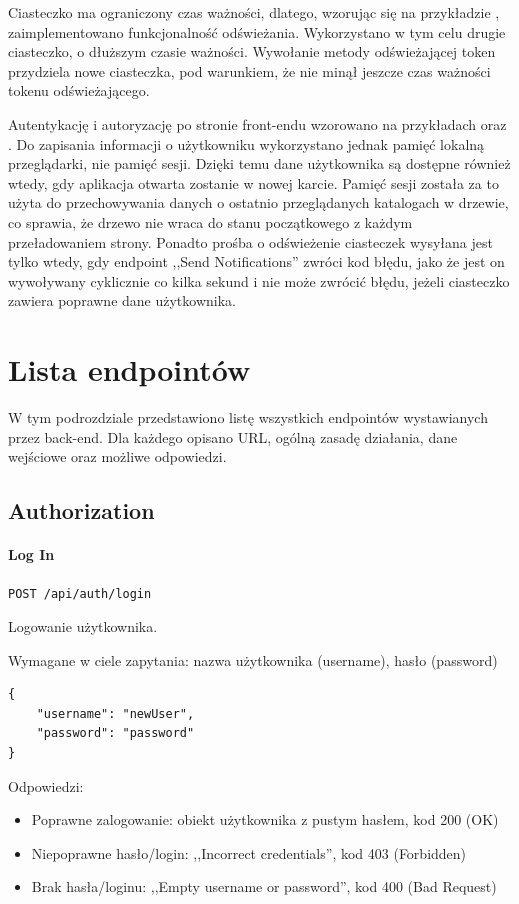 \documentclass[a4paper,twoside,12pt]{book}
\begin{document}
Ciasteczko ma ograniczony czas ważności, dlatego, wzorując się na przykładzie \cite{bib:bkspringrefresh}, zaimplementowano funkcjonalność odświeżania. Wykorzystano w tym celu drugie ciasteczko, o dłuższym czasie ważności. Wywołanie metody odświeżającej token przydziela nowe ciasteczka, pod warunkiem, że nie minął jeszcze czas ważności tokenu odświeżającego.

Autentykację i autoryzację po stronie front-endu wzorowano na przykładach \cite{bib:bkangularauth} oraz \cite{bib:bkangularrefresh}. Do zapisania informacji o użytkowniku wykorzystano jednak pamięć lokalną przeglądarki, nie pamięć sesji. Dzięki temu dane użytkownika są dostępne również wtedy, gdy aplikacja otwarta zostanie w nowej karcie. Pamięć sesji została za to użyta do przechowywania danych o ostatnio przeglądanych katalogach w drzewie, co sprawia, że drzewo nie wraca do stanu początkowego z każdym przeładowaniem strony. Ponadto prośba o odświeżenie ciasteczek wysyłana jest tylko wtedy, gdy endpoint ,,Send Notifications'' zwróci kod błędu, jako że jest on wywoływany cyklicznie co kilka sekund i nie może zwrócić błędu, jeżeli ciasteczko zawiera poprawne dane użytkownika.

\section{Lista endpointów}
\label{sec:lista-endpointow}
W tym podrozdziale przedstawiono listę wszystkich endpointów wystawianych przez back-end. Dla każdego opisano URL, ogólną zasadę działania, dane wejściowe oraz możliwe odpowiedzi.

\subsection{Authorization}

\paragraph{Log In}

\texttt{POST /api/auth/login}

Logowanie użytkownika.

Wymagane w ciele zapytania: nazwa użytkownika (username), hasło
(password)

\begin{verbatim}
{
    "username": "newUser",
    "password": "password"
}
\end{verbatim}

Odpowiedzi: 
\begin{itemize}
	\item Poprawne zalogowanie: obiekt użytkownika z pustym hasłem, kod 200 (OK) 
	\item Niepoprawne hasło/login: ,,Incorrect credentials'', kod 403 (Forbidden) 
	\item Brak hasła/loginu: ,,Empty username or password'', kod 400 (Bad Request) 
\end{itemize}
\end{document}
